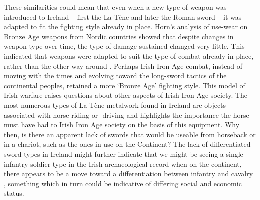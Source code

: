 These similarities could mean that even when a new type of weapon was introduced to Ireland – first the La Tène and later the Roman sword – 
it was adapted to fit the fighting style already in place. 
Horn’s analysis of use-wear on Bronze Age weapons from Nordic countries showed that despite changes in weapon type over time, the type of damage sustained changed very little. 
This indicated that weapons were adapted to suit the type of combat already in place, rather than the other way around \parencite[111\psq]{Horn2013}. 
Perhaps Irish Iron Age combat, instead of moving with the times and evolving toward the long-sword tactics of the continental peoples, retained a more ‘Bronze Age’ fighting style. 
This model of Irish warfare raises questions about other aspects of Irish Iron Age society. 
The most numerous types of La Tène metalwork found in Ireland are objects associated with horse-riding or -driving \parencite[178]{Mallory2013} and \textcite[368]{Dolan2014} highlights the importance the horse must have had to Irish Iron Age society on the basis of this equipment. 
Why then, is there an apparent lack of swords that would be useable from horseback or in a chariot, such as the ones in use on the Continent? 
The lack of differentiated sword types in Ireland might further indicate that we might be seeing a single infantry soldier type in the Irish archaeological record when on the continent, there appears to be a move toward a differentiation between infantry and cavalry \parencite[160]{Lejars2007}, 
something which in turn could be indicative of differing social and economic status.

